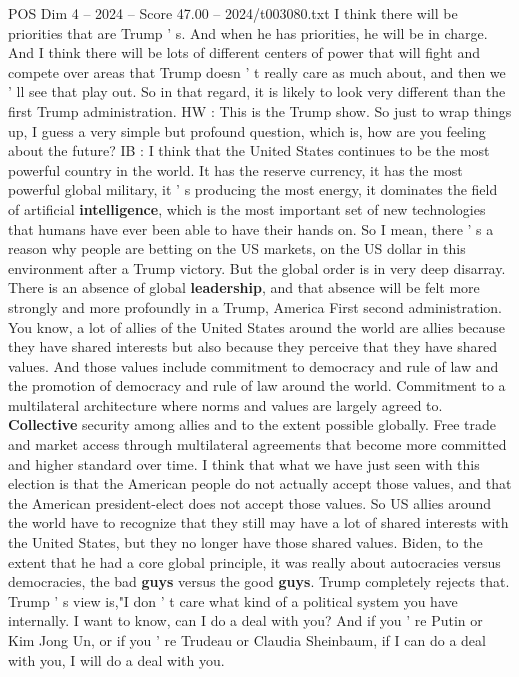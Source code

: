 \begin{textsample}{POS Dim 4 – 2024 – Score 47.00 – 2024/t003080.txt}
I think there will be priorities that are Trump ' s.
And when he has priorities, he will be in charge.
And I think there will be lots of different centers of power that will fight and compete over areas that Trump doesn ' t really care as much about, and then we ' ll see that play out.
So in that regard, it is likely to look very different than the first Trump administration.
HW : This is the Trump show.
So just to wrap things up, I guess a very simple but profound question, which is, how are you feeling about the future?
IB : I think that the United States continues to be the most powerful country in the world.
It has the reserve currency, it has the most powerful global military, it ' s producing the most energy, it dominates the field of artificial \textbf{intelligence}, which is the most important set of new technologies that humans have ever been able to have their hands on.
So I mean, there ' s a reason why people are betting on the US markets, on the US dollar in this environment after a Trump victory.
But the global order is in very deep disarray.
There is an absence of global \textbf{leadership}, and that absence will be felt more strongly and more profoundly in a Trump, America First second administration.
You know, a lot of allies of the United States around the world are allies because they have shared interests but also because they perceive that they have shared values.
And those values include commitment to democracy and rule of law and the promotion of democracy and rule of law around the world.
Commitment to a multilateral architecture where norms and values are largely agreed to. \textbf{Collective} security among allies and to the extent possible globally.
Free trade and market access through multilateral agreements that become more committed and higher standard over time.
I think that what we have just seen with this election is that the American people do not actually accept those values, and that the American president-elect does not accept those values.
So US allies around the world have to recognize that they still may have a lot of shared interests with the United States, but they no longer have those shared values.
Biden, to the extent that he had a core global principle, it was really about autocracies versus democracies, the bad \textbf{guys} versus the good \textbf{guys}.
Trump completely rejects that.
Trump ' s view is,"I don ' t care what kind of a political system you have internally.
I want to know, can I do a deal with you?
And if you ' re Putin or Kim Jong Un, or if you ' re Trudeau or Claudia Sheinbaum, if I can do a deal with you, I will do a deal with you.

\end{textsample}
